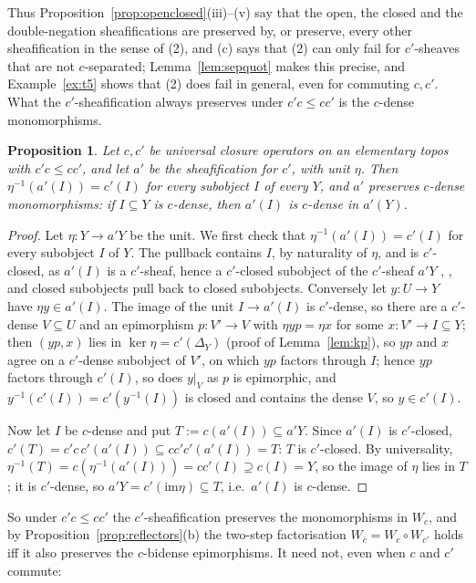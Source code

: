 \documentclass[11pt]{amsart}
\newtheorem{prop}[thm]{Proposition}
\theoremstyle{definition}
\newcommand{\im}{\mathrm{im}}
\begin{document}
Thus Proposition~\ref{prop:openclosed}(iii)--(v) say that the open, the
closed and the double-negation sheafifications are preserved by, or
preserve, every other sheafification in the sense of (2), and (c) says
that (2) can only fail for $c'$-sheaves that are not $c$-separated;
Lemma~\ref{lem:sepquot} makes this precise, and Example~\ref{ex:t5} shows
that (2) does fail in general, even for commuting $c,c'$. What the
$c'$-sheafification always preserves under $c'c\le cc'$ is the
$c$-dense monomorphisms.

\begin{prop}\label{prop:densemono}
Let $c,c'$ be universal closure operators on an elementary topos with
$c'c\le cc'$, and let $a'$ be the sheafification for $c'$, with unit
$\eta$. Then $\eta^{-1}(a'(I))=c'(I)$ for every subobject $I$ of every
$Y$, and $a'$ preserves $c$-dense monomorphisms: if $I\subseteq Y$ is
$c$-dense, then $a'(I)$ is $c$-dense in $a'(Y)$.
\end{prop}
\begin{proof}
Let $\eta\colon Y\to a'Y$ be the unit. We first check that
$\eta^{-1}(a'(I))=c'(I)$ for every subobject $I$ of $Y$. The pullback
contains $I$, by naturality of $\eta$, and is $c'$-closed, as $a'(I)$ is a
$c'$-sheaf, hence a $c'$-closed subobject of the $c'$-sheaf $a'Y$
\cite[V.3]{MLM}, \cite[A4.3]{Elephant}, and closed subobjects pull back to
closed subobjects. Conversely let $y\colon U\to Y$ have $\eta y\in a'(I)$.
The image of the unit $I\to a'(I)$ is $c'$-dense, so there are a
$c'$-dense $V\subseteq U$ and an epimorphism $p\colon V'\to V$ with
$\eta y p=\eta x$ for some $x\colon V'\to I\subseteq Y$; then $(yp,x)$ lies
in $\ker\eta=c'(\Delta_Y)$ (proof of Lemma~\ref{lem:kp}), so $yp$ and $x$
agree on a $c'$-dense subobject of $V'$, on which $yp$ factors through
$I$; hence $yp$ factors through $c'(I)$, so does $y|_V$ as $p$ is
epimorphic, and $y^{-1}(c'(I))=c'(y^{-1}(I))$ is closed and contains the
dense $V$, so $y\in c'(I)$.

Now let $I$ be $c$-dense and put $T:=c(a'(I))\subseteq a'Y$. Since
$a'(I)$ is $c'$-closed, $c'(T)=c'c\,c'(a'(I))\subseteq cc'c'(a'(I))=T$: $T$
is $c'$-closed. By universality, $\eta^{-1}(T)=c(\eta^{-1}(a'(I)))=
cc'(I)\supseteq c(I)=Y$, so the image of $\eta$ lies in $T$; it is
$c'$-dense, so $a'Y=c'(\im\eta)\subseteq T$, i.e.\ $a'(I)$ is $c$-dense.
\end{proof}

So under $c'c\le cc'$ the $c'$-sheafification preserves the monomorphisms
in $W_c$, and by Proposition~\ref{prop:reflectors}(b) the two-step
factorisation $W_{\bar c}=W_c\circ W_{c'}$ holds iff it also preserves the
$c$-bidense epimorphisms. It need not, even when $c$ and $c'$ commute:
\end{document}
